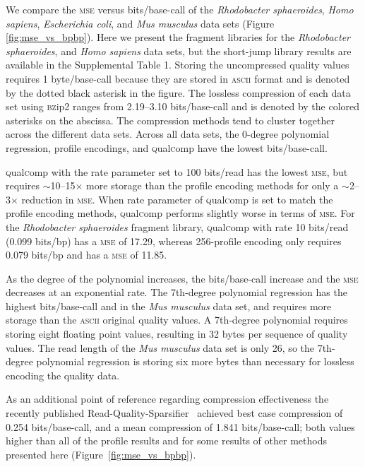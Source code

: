 \documentclass{bioinfo}
\begin{document}
We compare the \textsc{mse} versus bits/base-call of the
\textit{Rhodobacter sphaeroides}, \textit{Homo sapiens},
\textit{Escherichia coli}, and \textit{Mus musculus} data sets (Figure
\ref{fig:mse_vs_bpbp}). Here we present the fragment libraries for the
\textit{Rhodobacter sphaeroides}, and \textit{Homo sapiens} data sets,
but the short-jump library results are available in the Supplemental
Table 1. Storing the uncompressed quality values requires 1
byte/base-call because they are stored in \textsc{ascii} format and is
denoted by the dotted black asterisk in the figure. The lossless
compression of each data set using \textsc{bz}ip2 ranges from
2.19--3.10 bits/base-call and is denoted by the colored asterisks on
the abscissa. The compression methods tend to cluster together across
the different data sets. Across all data sets, the 0-degree polynomial
regression, profile encodings, and \textsc{q}ual\textsc{c}omp have the
lowest bits/base-call.

\textsc{q}ual\textsc{c}omp with the rate parameter set to 100
bits/read has the lowest \textsc{mse}, but requires
$\sim$10--15$\times$ more storage than the profile encoding methods
for only a $\sim$2--3$\times$ reduction in \textsc{mse}. When rate
parameter of \textsc{q}ual\textsc{c}omp is set to match the profile
encoding methods, \textsc{q}ual\textsc{c}omp performs slightly worse
in terms of \textsc{mse}. For the \textit{Rhodobacter sphaeroides}
fragment library, \textsc{q}ual\textsc{c}omp with rate 10 bits/read
(0.099 bits/bp) has a \textsc{mse} of 17.29, whereas 256-profile
encoding only requires 0.079 bits/bp and has a \textsc{mse} of 11.85.

As the degree of the polynomial increases, the bits/base-call increase
and the \textsc{mse} decreases at an exponential rate. The 7th-degree
polynomial regression has the highest bits/base-call and in the
\textit{Mus musculus} data set, and requires more storage than the
\textsc{ascii} original quality values. A 7th-degree polynomial
requires storing eight floating point values, resulting in 32 bytes
per sequence of quality values. The read length of the \textit{Mus
  musculus} data set is only 26, so the 7th-degree polynomial
regression is storing six more bytes than necessary for lossless
encoding the quality data.

As an additional point of reference regarding compression
effectiveness the recently published
Read-Quality-Sparsifier~\citep{DBLP:conf/recomb/YuYB14} achieved best
case compression of 0.254 bits/base-call, and a mean compression of
1.841 bits/base-call; both values higher than all of the profile
results and for some results of other methods presented here
(Figure~\ref{fig:mse_vs_bpbp}).
\end{document}

